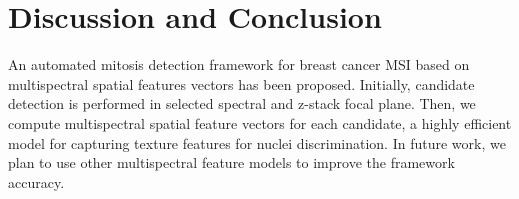 \documentclass[10pt,twocolumn,letterpaper]{article}
\begin{document}
\section{Discussion and Conclusion}
\label{sec:conclusion}
An automated mitosis detection framework for breast cancer MSI based on multispectral spatial features vectors has been proposed. Initially, candidate detection is performed in selected spectral and z-stack focal plane. Then, we compute multispectral spatial feature vectors for each candidate, a highly efficient model for capturing texture features for nuclei discrimination. In future work, we plan to use other multispectral feature models to improve the framework accuracy. 
{\small


}
\end{document}
